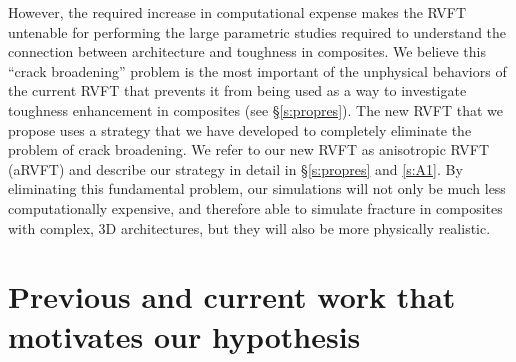 \documentclass[10pt,letterpaper]{article}
\begin{document}
    However, the required increase in computational expense makes the RVFT untenable for performing the large parametric studies required to understand the connection between architecture and toughness in composites. We believe this ``crack broadening'' problem is the most important of the unphysical behaviors of the current RVFT that prevents it from being used as a way to investigate toughness enhancement in composites (see \S \ref{s:propres}). The new RVFT that we propose uses a strategy that we have developed to completely eliminate the problem of crack broadening. We refer to our new RVFT as anisotropic RVFT (aRVFT) and describe our strategy in detail in \S \ref{s:propres} and \ref{s:A1}. By eliminating this fundamental problem, our simulations will not only be much less computationally expensive, and therefore able to simulate fracture in composites with complex, 3D architectures, but they will also be more physically realistic.

\section{Previous and current work that motivates our hypothesis}
  \label{s:prevcurr}

\end{document}
